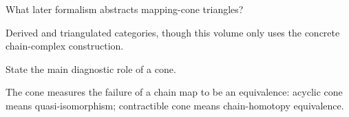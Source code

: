 \begin{problem}\label{prob:viii24-21}
What later formalism abstracts mapping-cone triangles?
\end{problem}
\begin{solution}
Derived and triangulated categories, though this volume only uses the concrete chain-complex construction.
\end{solution}

\begin{problem}\label{prob:viii24-22}
State the main diagnostic role of a cone.
\end{problem}
\begin{solution}
The cone measures the failure of a chain map to be an equivalence: acyclic cone means quasi-isomorphism; contractible cone means chain-homotopy equivalence.
\end{solution}
